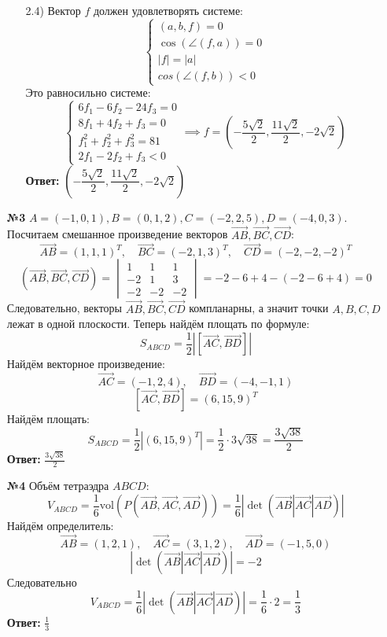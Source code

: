 \documentclass[a4paper]{article}
\newcommand{\vmat}[1]{\begin{vmatrix} #1 \end{vmatrix}}
\renewcommand{\f}[2]{\frac{#1}{#2}}
\newcommand{\case}[1]{\begin{cases} #1 \end{cases}}
\newcommand{\vol}{\text{vol}}
\begin{document}
\begin{enumerate}
\begin{enumerate}
        \item[2.4)]Вектор $f$ должен удовлетворять системе:
        $$\case{
            (a, b, f) = 0\\
            \cos(\angle(f, a)) = 0\\
            |f| = |a| \\
            cos(\angle(f, b)) < 0
        }$$
        Это равносильно системе:
        $$\begin{cases}
            6f_1 - 6f_2 - 24f_3 = 0 \\
            8f_1 + 4f_2 + f_3 = 0 \\
            f_1^2 + f_2^2 + f_3^2 = 81 \\
            2f_1 - 2f_2 + f_3 < 0
        \end{cases} \implies f = \left( -\dfrac{5\sqrt{2}}{2}, \dfrac{11\sqrt{2}}{2}, -2\sqrt{2} \right)$$
        \textbf{Ответ: } $\left( -\dfrac{5\sqrt{2}}{2}, \dfrac{11\sqrt{2}}{2}, -2\sqrt{2} \right)$  \\  
    \end{enumerate}

    \item[\textbf{№3}]$A = (-1, 0, 1), B = (0, 1, 2), C = (-2, 2, 5), D = (-4, 0, 3)$. 
    Посчитаем смешанное произведение векторов $\vec{AB}, \vec{BC}, \vec{CD}$:
    $$\vec{AB} = (1, 1, 1)^T, \quad \vec{BC} = (-2, 1, 3)^T, \quad \vec{CD} = (-2, -2, -2)^T$$
    $$(\vec{AB}, \vec{BC}, \vec{CD}) = \vmat{1 & 1 & 1 \\ -2 & 1 & 3 \\ -2 & -2 & -2} = 
    -2-6+4-(-2-6+4) = 0$$
    Следовательно, векторы $\vec{AB}, \vec{BC}, \vec{CD}$ компланарны, а значит точки $A, B, C, D$ лежат в одной плоскости. 
    Теперь найдём площать по формуле:
    $$S_{ABCD} = \f{1}{2}\left| \left[\vec{AC}, \vec{BD}\right] \right|$$
    Найдём векторное произведение:
    $$\vec{AC} = (-1, 2, 4), \quad \vec{BD} = (-4, -1, 1)$$
    $$\left[\vec{AC}, \vec{BD}\right] = (6, 15, 9)^T$$
    Найдём площать:
    $$S_{ABCD} = \f{1}{2}\left|(6, 15, 9)^T\right| = \f{1}{2} \cdot 3\sqrt{38} = \f{3\sqrt{38}}{2}$$
    \textbf{Ответ: } $\f{3\sqrt{38}}{2}$

    \item[\textbf{№4}]Объём тетраэдра $ABCD$:
    $$V_{ABCD} = \f{1}{6}\vol(P(\vec{AB}, \vec{AC}, \vec{AD}))
    = \f{1}{6}|\det(\vec{AB}| \vec{AC}| \vec{AD})|$$
    Найдём определитель:
    $$\vec{AB} = (1, 2, 1), \quad \vec{AC} = (3, 1, 2), \quad \vec{AD} = (-1, 5, 0)$$
    $$|\det(\vec{AB}| \vec{AC}| \vec{AD})| = -2$$
    Следовательно
    $$V_{ABCD} = \f{1}{6}|\det(\vec{AB}| \vec{AC}| \vec{AD})| =
    \f{1}{6}\cdot 2  = \f{1}{3}$$
    \textbf{Ответ:} $\f{1}{3}$\\
\end{enumerate}
\end{document}
